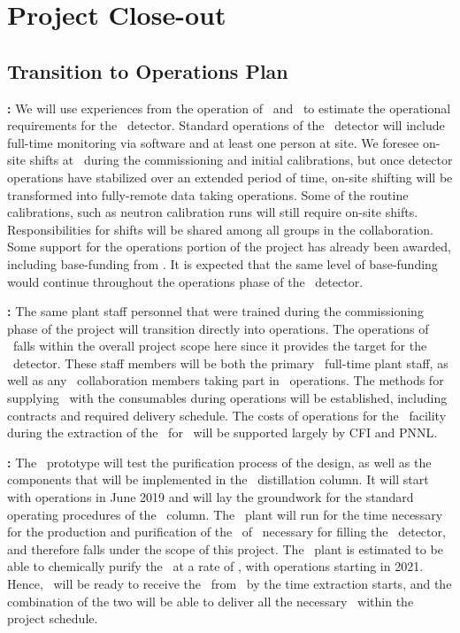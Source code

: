 \section{Project Close-out}

\subsection{Transition to Operations Plan}

\textbf{\DSks:} We will use experiences from the operation of \DSf\ and \DSp\ to estimate the operational requirements for the \DSks\ detector. Standard operations of the \DSks\ detector will include full-time monitoring via software and at least one person at site. We foresee on-site shifts at \LNGS\ during the commissioning and initial calibrations, but once detector operations have stabilized over an extended period of time, on-site shifting will be transformed into fully-remote data taking operations. Some of the routine calibrations, such as neutron calibration runs will still require on-site shifts.  Responsibilities for shifts will be shared among all groups in the collaboration. Some support for the operations portion of the project has already been awarded, including base-funding from \NSF.  It is expected that the same level of base-funding would continue throughout the operations phase of the \DSks\ detector.

\textbf{\Urania:} The same plant staff personnel that were trained during the commissioning phase of the project will transition directly into operations.  The operations of \Urania\ falls within the overall project scope here since it provides the target for the \DSks\ detector. These staff members will be both the primary \Urania\ full-time plant staff, as well as any \DS\ collaboration members taking part in \Urania\ operations. The methods for supplying \Urania\ with the consumables during operations will be established, including contracts and required delivery schedule. The costs of operations for the \Urania\ facility during the extraction of the \UAr\ for \DSks\ will be supported largely by CFI and PNNL.

\textbf{\Aria:} The \SeruciZero\ prototype will test the purification process of the design, as well as the components that will be implemented in the \SeruciOne\ distillation column. It will start with operations in June 2019 and will lay the groundwork for the standard operating procedures of the \SeruciOne\ column. The \SeruciOne\ plant will run for the time necessary for the production and purification of the \UraniaTotalDSkProduction\ of \UAr\ necessary for filling the \DSks\ detector, and therefore falls under the scope of this project. The \SeruciOne\ plant is estimated to be able to chemically purify the \UAr\ at a rate of \AriaChemicalRate, with operations starting in 2021. Hence, \Aria\ will be ready to receive the \UAr\ from \Urania\ by the time extraction starts, and the combination of the two will be able to deliver all the necessary \UAr\ within the project schedule. 

